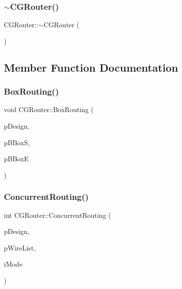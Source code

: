 \mbox{\label{classCGRouter_ab96e5ed8e11e1834c47fec6961f01c23}} 
\subsubsection{\texorpdfstring{$\sim$CGRouter()}{~CGRouter()}}
{\footnotesize\ttfamily C\+G\+Router\+::$\sim$\+C\+G\+Router (\begin{DoxyParamCaption}{ }\end{DoxyParamCaption})\hspace{0.3cm}{\ttfamily [virtual]}}



\subsection{Member Function Documentation}
\mbox{\label{classCGRouter_a65501a12c10da7894dc0e96ce5c449c0}} 
\subsubsection{\texorpdfstring{BoxRouting()}{BoxRouting()}}
{\footnotesize\ttfamily void C\+G\+Router\+::\+Box\+Routing (\begin{DoxyParamCaption}\item[{\mbox{\hyperlink{classCDesign}{C\+Design}} $\ast$}]{p\+Design,  }\item[{\mbox{\hyperlink{classCBBox}{C\+B\+Box}} $\ast$}]{p\+B\+BoxS,  }\item[{\mbox{\hyperlink{classCBBox}{C\+B\+Box}} $\ast$}]{p\+B\+BoxE }\end{DoxyParamCaption})\hspace{0.3cm}{\ttfamily [static]}}

\mbox{\label{classCGRouter_a5c1d10e81773579ad3acbdaf5965725e}} 
\subsubsection{\texorpdfstring{ConcurrentRouting()}{ConcurrentRouting()}}
{\footnotesize\ttfamily int C\+G\+Router\+::\+Concurrent\+Routing (\begin{DoxyParamCaption}\item[{\mbox{\hyperlink{classCDesign}{C\+Design}} $\ast$}]{p\+Design,  }\item[{vector$<$ \mbox{\hyperlink{classCWire}{C\+Wire}} $\ast$ $>$ $\ast$}]{p\+Wire\+List,  }\item[{int}]{i\+Mode }\end{DoxyParamCaption})\hspace{0.3cm}{\ttfamily [static]}}

